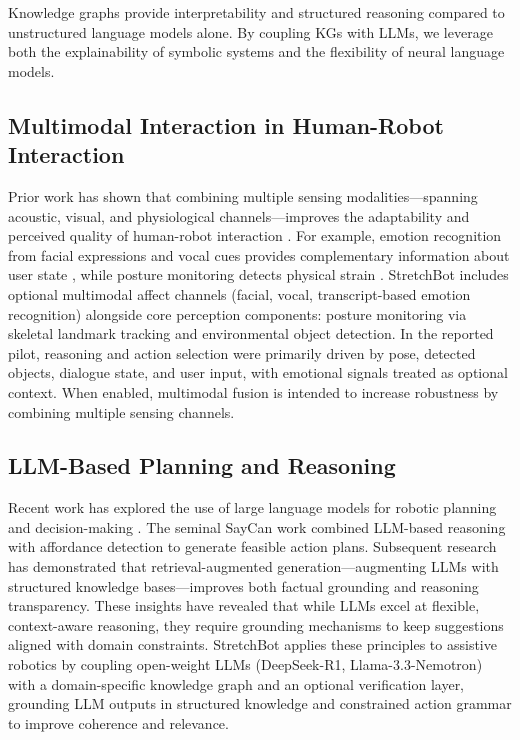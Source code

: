 \documentclass[pdflatex,sn-basic,Numbered,iicol,twocolumn]{sn-jnl}%
\begin{document}
Knowledge graphs provide interpretability and structured reasoning compared to unstructured language models alone. By coupling KGs with LLMs, we leverage both the explainability of symbolic systems and the flexibility of neural language models.

\subsection{Multimodal Interaction in Human-Robot Interaction}

Prior work has shown that combining multiple sensing modalities—spanning acoustic, visual, and physiological channels—improves the adaptability and perceived quality of human-robot interaction \cite{D'Elia2014}. For example, emotion recognition from facial expressions and vocal cues provides complementary information about user state \cite{Serengil2016}, while posture monitoring detects physical strain \cite{Cao2019}. StretchBot includes optional multimodal affect channels (facial, vocal, transcript-based emotion recognition) alongside core perception components: posture monitoring via skeletal landmark tracking \cite{MediaPipe2020} and environmental object detection. In the reported pilot, reasoning and action selection were primarily driven by pose, detected objects, dialogue state, and user input, with emotional signals treated as optional context. When enabled, multimodal fusion is intended to increase robustness by combining multiple sensing channels.

\subsection{LLM-Based Planning and Reasoning}

Recent work has explored the use of large language models for robotic planning and decision-making \cite{AhnEtAl2022, Brown2020}. The seminal SayCan work \cite{AhnEtAl2022} combined LLM-based reasoning with affordance detection to generate feasible action plans. Subsequent research \cite{Lewis2020} has demonstrated that retrieval-augmented generation—augmenting LLMs with structured knowledge bases—improves both factual grounding and reasoning transparency. These insights have revealed that while LLMs excel at flexible, context-aware reasoning, they require grounding mechanisms to keep suggestions aligned with domain constraints. StretchBot applies these principles to assistive robotics by coupling open-weight LLMs (DeepSeek-R1, Llama-3.3-Nemotron) with a domain-specific knowledge graph and an optional verification layer, grounding LLM outputs in structured knowledge and constrained action grammar to improve coherence and relevance.
\end{document}
